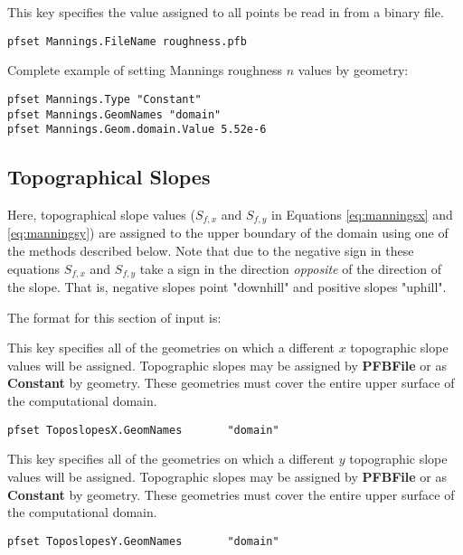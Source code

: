 {
This key specifies the value assigned to all points be read in from a \parflow{} binary file.
}
\begin{display}\begin{verbatim}
pfset Mannings.FileName roughness.pfb
\end{verbatim}\end{display}

Complete example of setting Mannings roughness $n$ values by geometry:
\begin{display}\begin{verbatim}
pfset Mannings.Type "Constant"
pfset Mannings.GeomNames "domain"
pfset Mannings.Geom.domain.Value 5.52e-6
\end{verbatim}\end{display}

\subsection{Topographical Slopes}
\label{Topographical Slopes}

Here, topographical slope values ($S_{f,x}$ and $S_{f,y}$ in Equations \ref{eq:manningsx} and \ref{eq:manningsy}) are assigned to the upper boundary of the domain using one of the methods described below. Note that due to the negative sign in these equations $S_{f,x}$ and $S_{f,y}$ take a sign in the direction \emph{opposite} of the direction of the slope.  That is, negative slopes point "downhill" and positive slopes "uphill".

The format for this section of input is:

{
This key specifies all of the geometries on which a different $x$ topographic slope values will be
assigned.  Topographic slopes may be assigned by {\bf PFBFile} or as {\bf Constant} by geometry.  These geometries must cover the entire upper surface of the computational domain.
}
\begin{display}\begin{verbatim}
pfset ToposlopesX.GeomNames       "domain"
\end{verbatim}\end{display}

{
This key specifies all of the geometries on which a different $y$ topographic slope values will be
assigned.  Topographic slopes may be assigned by {\bf PFBFile} or as {\bf Constant} by geometry.  These geometries must cover the entire upper surface of the computational domain.
}
\begin{display}\begin{verbatim}
pfset ToposlopesY.GeomNames       "domain"
\end{verbatim}\end{display}

